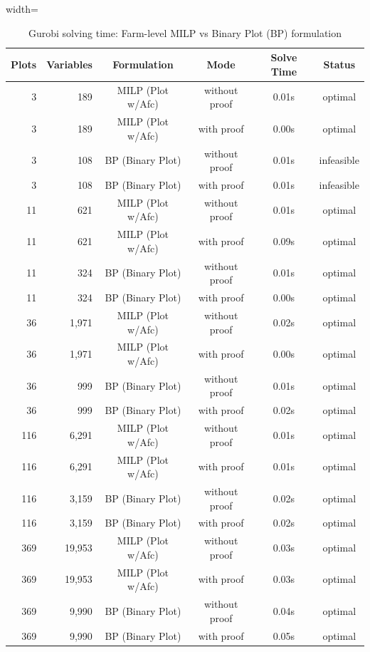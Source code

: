 \documentclass{oqireport}
\begin{document}
\begin{table}[H]
\centering
\caption{Gurobi solving time: Farm-level MILP vs Binary Plot (BP) formulation}
\label{tab:gurobi_formulation_comparison}
\small
\begin{adjustbox}{width=\textwidth}
\begin{tabular}{rrcccc}
\toprule
\textbf{Plots} & \textbf{Variables} & \textbf{Formulation} & \textbf{Mode} & \textbf{Solve Time} & \textbf{Status} \\
\midrule
3 & 189 & MILP (Plot w/Afc) & without proof & 0.01s & optimal \\
3 & 189 & MILP (Plot w/Afc) & with proof & 0.00s & optimal \\
3 & 108 & BP (Binary Plot) & without proof & 0.01s & infeasible \\
3 & 108 & BP (Binary Plot) & with proof & 0.01s & infeasible \\
\midrule
11 & 621 & MILP (Plot w/Afc) & without proof & 0.01s & optimal \\
11 & 621 & MILP (Plot w/Afc) & with proof & 0.09s & optimal \\
11 & 324 & BP (Binary Plot) & without proof & 0.01s & optimal \\
11 & 324 & BP (Binary Plot) & with proof & 0.00s & optimal \\
\midrule
36 & 1,971 & MILP (Plot w/Afc) & without proof & 0.02s & optimal \\
36 & 1,971 & MILP (Plot w/Afc) & with proof & 0.00s & optimal \\
36 & 999 & BP (Binary Plot) & without proof & 0.01s & optimal \\
36 & 999 & BP (Binary Plot) & with proof & 0.02s & optimal \\
\midrule
116 & 6,291 & MILP (Plot w/Afc) & without proof & 0.01s & optimal \\
116 & 6,291 & MILP (Plot w/Afc) & with proof & 0.01s & optimal \\
116 & 3,159 & BP (Binary Plot) & without proof & 0.02s & optimal \\
116 & 3,159 & BP (Binary Plot) & with proof & 0.02s & optimal \\
\midrule
369 & 19,953 & MILP (Plot w/Afc) & without proof & 0.03s & optimal \\
369 & 19,953 & MILP (Plot w/Afc) & with proof & 0.03s & optimal \\
369 & 9,990 & BP (Binary Plot) & without proof & 0.04s & optimal \\
369 & 9,990 & BP (Binary Plot) & with proof & 0.05s & optimal \\

\end{tabular}
\end{adjustbox}
\end{table}
\end{document}
